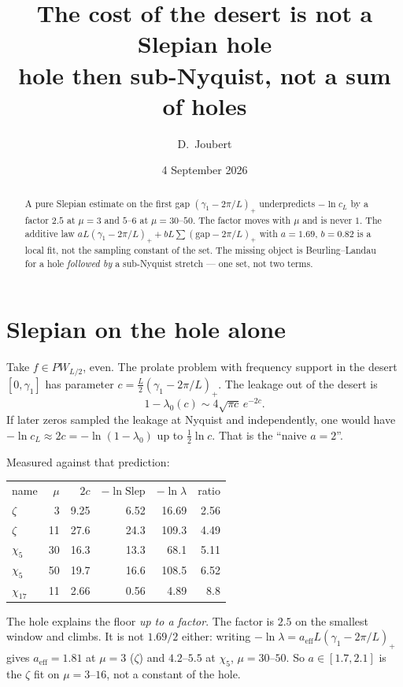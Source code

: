 \documentclass[11pt]{article}
\title{The cost of the desert is not a Slepian hole\\
\large hole then sub-Nyquist, not a sum of holes}
\author{D.\ Joubert}
\date{4 September 2026}
\begin{document}
\maketitle
\begin{abstract}
\noindent
A pure Slepian estimate on the first gap $(\gamma_1-2\pi/L)_+$
underpredicts $-\ln c_L$ by a factor $2.5$ at $\mu=3$ and $5$--$6$
at $\mu=30$--$50$. The factor moves with $\mu$ and is never $1$.
The additive law $aL(\gamma_1-2\pi/L)_++bL\sum(\mathrm{gap}-2\pi/L)_+$
with $a=1.69$, $b=0.82$ is a local fit, not the sampling constant of
the set. The missing object is Beurling--Landau for a hole
\emph{followed by} a sub-Nyquist stretch --- one set, not two terms.
\end{abstract}

\section{Slepian on the hole alone}
Take $f\in PW_{L/2}$, even. The prolate problem with frequency
support in the desert $[0,\gamma_1]$ has parameter
$c=\tfrac L2(\gamma_1-2\pi/L)_+$. The leakage out of the desert is
\[
1-\lambda_0(c)\sim 4\sqrt{\pi c}\,e^{-2c}.
\]
If later zeros sampled the leakage at Nyquist and independently,
one would have $-\ln c_L\approx 2c=-\ln(1-\lambda_0)$ up to
$\tfrac12\ln c$. That is the ``naive $a=2$''.

Measured against that prediction:

\begin{center}
\begin{tabular}{lrrrrr}
name & $\mu$ & $2c$ & $-\ln\mathrm{Slep}$ & $-\ln\lambda$ & ratio\\
$\zeta$ & 3 & 9.25 & 6.52 & 16.69 & 2.56\\
$\zeta$ & 11 & 27.6 & 24.3 & 109.3 & 4.49\\
$\chi_5$ & 30 & 16.3 & 13.3 & 68.1 & 5.11\\
$\chi_5$ & 50 & 19.7 & 16.6 & 108.5 & 6.52\\
$\chi_{17}$ & 11 & 2.66 & 0.56 & 4.89 & 8.8\\
\end{tabular}
\end{center}

The hole explains the floor \emph{up to a factor}. The factor is
$2.5$ on the smallest window and climbs. It is not $1.69/2$ either:
writing $-\ln\lambda=a_{\mathrm{eff}}L(\gamma_1-2\pi/L)_+$ gives
$a_{\mathrm{eff}}=1.81$ at $\mu=3$ ($\zeta$) and $4.2$--$5.5$ at
$\chi_5$, $\mu=30$--$50$. So $a\in[1.7,2.1]$ is the $\zeta$ fit on
$\mu=3$--$16$, not a constant of the hole.
\end{document}
